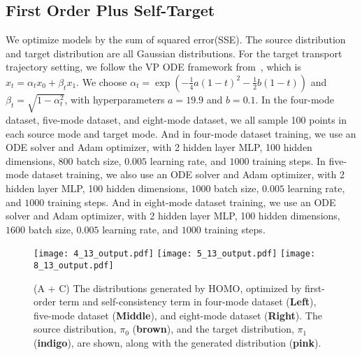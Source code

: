 \subsection{First Order Plus Self-Target}\label{sec:app:first_order_plus_self_target}
We optimize models by the sum of squared error(SSE). The source distribution and target distribution are all Gaussian distributions. For the target transport trajectory setting, we follow the VP ODE framework from~\cite{rectified_flow}, which is $x_t = \alpha_t x_0 + \beta_t x_1$. We choose $\alpha_t = \exp(-\frac{1}{4} a(1-t)^2 - \frac{1}{2} b(1-t))$ and $\beta_t = \sqrt{1 - \alpha_t^2}$, with hyperparameters $a = 19.9$ and $b = 0.1$. In the four-mode dataset, five-mode dataset, and eight-mode dataset, we all sample 100 points in each source mode and target mode. And in four-mode dataset training, we use an ODE solver and Adam optimizer, with 2 hidden layer MLP, 100 hidden dimensions, $800$ batch size, $0.005$ learning rate, and $1000$ training steps. In five-mode dataset training, we also use an ODE solver and Adam optimizer, with 2 hidden layer MLP, 100 hidden dimensions, $1000$ batch size, $0.005$ learning rate, and $1000$ training steps. And in eight-mode dataset training, we use an ODE solver and Adam optimizer, with 2 hidden layer MLP, 100 hidden dimensions, $1600$ batch size, $0.005$ learning rate, and $1000$ training steps. 
\begin{figure}[!ht]
\centering
\texttt{[image: 4\_13\_output.pdf]}
\texttt{[image: 5\_13\_output.pdf]}
\texttt{[image: 8\_13\_output.pdf]}
\caption{
(A + C) The distributions generated by HOMO, optimized by first-order term and self-consistency term in four-mode dataset (\textbf{Left}), five-mode dataset (\textbf{Middle}), and eight-mode dataset (\textbf{Right}). 
The source distribution, $\pi_0$ ({\textbf{brown}}), and the target distribution, $\pi_1$ ({\textbf{indigo}}), are shown, along with the generated distribution ({\textbf{pink}}). 
}
\label{fig:13_distribution}
\end{figure}

